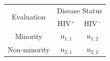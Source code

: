 \documentclass[12pt]{article}
\begin{document}
\begin{table}[H]
\large 
\centering 
\begin{tabular}{|c|c|c|}
\hline
\multirow{2}{*}{Evaluation} & \multicolumn{2}{c|}{Disease Status} \\
\hhline{~--}
 & HIV$^{+}$ & HIV$^{-}$ \\
\hline
Minority & n$_{1,1}$ & n$_{1,2}$  \\
\hline 
Non-minority & n$_{2,1}$ & n$_{2,2}$ \\
\hline
\end{tabular}
\end{table}
\end{document}
